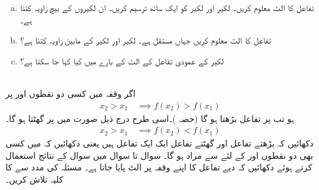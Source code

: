 \begin{enumerate}[a.]
\item
تفاعل  کا الٹ معلوم کریں۔ لکیر  اور لکیر  کو ایک ساتھ ترسیم کریں۔ ان لکیروں کے بیچ زاویہ کتنا ہے۔
\item
تفاعل  کا الٹ معلوم کریں جہاں  مستقل ہے۔ لکیر  اور لکیر  کے مابین زاویہ کتنا ہے؟
\item
لکیر  کے عمودی تفاعل کے الٹ کے بارے میں کیا کہا جا سکتا ہے؟
\end{enumerate}
\\
اگر وقفہ  میں کسی دو نقطوں  اور  پر 
\begin{align*}
x_2>x_1\quad \implies f(x_2)>f(x_1)
\end{align*}
ہو تب  پر تفاعل  بڑھتا ہو گا (حصہ )۔اسی طرح  درج ذیل صورت میں  پر  گھٹتا ہو گا۔
\begin{align*}
x_2>x_1\quad \implies f(x_2)<f(x_1)
\end{align*}
دکھائیں کہ بڑھتے تفاعل اور گھٹتے تفاعل ایک ایک تفاعل ہیں یعنی دکھائیں کہ  میں کسی بھی دو نقطوں  اور  کے لئے  سے مراد  ہو گا۔ 
سوال  تا سوال  میں سوال  کے نتائج استعمال کرتے ہوئے دکھائیں کہ دیے تفاعل کا اپنے وقفہ پر الٹ پایا جاتا ہے۔ مسئلہ  کی مدد سے  کا کلیہ تلاش کریں۔

